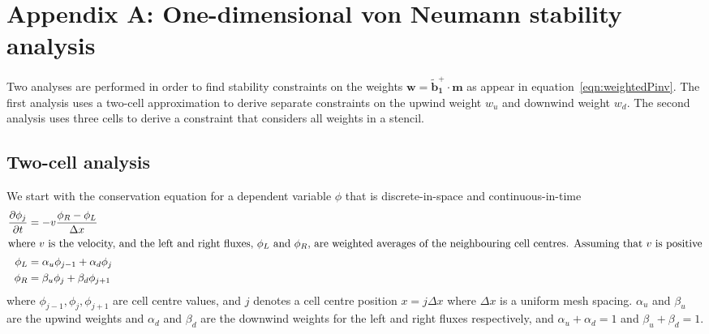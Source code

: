 \section*{Appendix A: One-dimensional von Neumann stability analysis}
Two analyses are performed in order to find stability constraints on the weights $\mathbf{w} = \mathbf{\tilde{b}_1^+} \cdot \mathbf{m}$ as appear in equation~\eqref{eqn:weightedPinv}.  The first analysis uses a two-cell approximation to derive separate constraints on the upwind weight $w_u$ and downwind weight $w_d$.  The second analysis uses three cells to derive a constraint that considers all weights in a stencil.

\subsection*{Two-cell analysis}
We start with the conservation equation for a dependent variable $\phi$ that is discrete-in-space and continuous-in-time
\begin{align}
\frac{\partial \phi_j}{\partial t} &= - v \frac{\phi_R - \phi_L}{\Delta x} \label{eqn:advectionLR} \\
%
\intertext{where $v$ is the velocity, and the left and right fluxes, $\phi_L$ and $\phi_R$, are weighted averages of the neighbouring cell centres.  Assuming that $v$ is positive}
%
\phi_L &= \alpha_u \phi_{j-1} + \alpha_d \phi_j \\
\phi_R &= \beta_u \phi_j + \beta_d \phi_{j+1}
\end{align}
where $\phi_{j-1}, \phi_j, \phi_{j+1}$ are cell centre values, and $j$ denotes a cell centre position $x = j \Delta x$ where $\Delta x$ is a uniform mesh spacing.
$\alpha_u$ and $\beta_u$ are the upwind weights and $\alpha_d$ and $\beta_d$ are the downwind weights for the left and right fluxes respectively, and $\alpha_u + \alpha_d = 1$ and $\beta_u + \beta_d = 1$.

